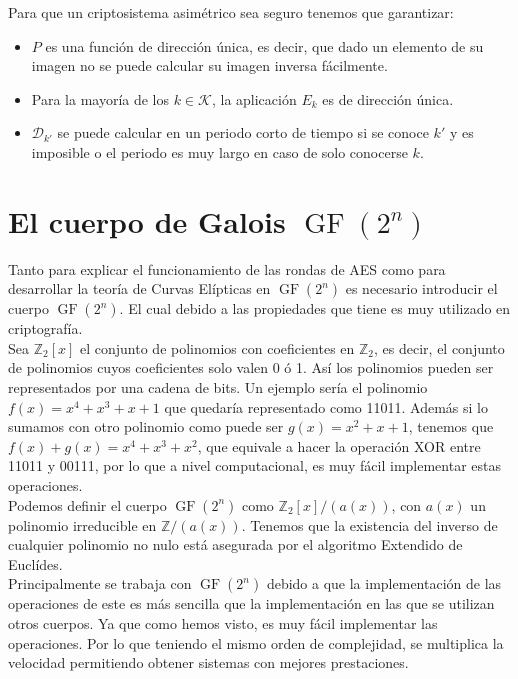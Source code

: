 Para que un criptosistema asimétrico sea seguro tenemos que garantizar:
\begin{itemize}
	\item $P$ es una función de dirección única, es decir, que dado un elemento de su imagen no se puede calcular su imagen inversa fácilmente.
	\item Para la mayoría de los $k \in \mathcal{K}$, la aplicación $E_k$ es de dirección única.
	\item $\mathcal{D}_{k'}$ se puede calcular en un periodo corto de tiempo si se conoce $k'$ y es imposible o el periodo es muy largo en caso de solo conocerse $k$.
\end{itemize}

\section{El cuerpo de Galois $\operatorname{GF}(2^n)$}
Tanto para explicar el funcionamiento de las rondas de AES como para desarrollar la teoría de Curvas Elípticas en $\operatorname{GF}(2^n)$ es necesario introducir el cuerpo $\operatorname{GF}(2^n)$. El cual debido a las propiedades que tiene es muy utilizado en criptografía.\\
Sea $\mathbb{Z}_2[x]$ el conjunto de polinomios con coeficientes en $\mathbb{Z}_2$, es decir, el conjunto de polinomios cuyos coeficientes solo valen 0 ó 1. Así los polinomios pueden ser representados por una cadena de bits.
 Un ejemplo sería el polinomio $f(x)=x^4+x^3+x+1$ que quedaría representado como 11011. 
Además si lo sumamos con otro polinomio como puede ser $g(x)=x^2+x+1$, tenemos que $f(x)+g(x)=x^4+x^3+x^2$, que equivale a hacer la operación XOR entre 11011 y 00111, por lo que a nivel computacional, es muy fácil implementar estas operaciones.\\
Podemos definir el cuerpo $\operatorname{GF}(2^n)$ como $\mathbb{Z}_2[x]/(a(x))$, con $a(x)$ un polinomio irreducible en $\mathbb{Z}/(a(x))$. Tenemos que la existencia del inverso de cualquier polinomio no nulo está asegurada por el algoritmo Extendido de Euclídes.\\ 
Principalmente se trabaja con $\operatorname{GF}(2^n)$ debido a que la implementación de las operaciones de este es más sencilla que la implementación en las que se utilizan otros cuerpos. Ya que como hemos visto, es muy fácil implementar las operaciones. Por lo que teniendo el mismo orden de complejidad, se multiplica la velocidad permitiendo obtener sistemas con mejores prestaciones.\\
